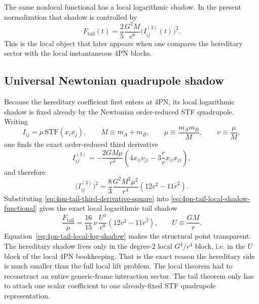 \documentclass[11pt]{article}
\begin{document}
The same nonlocal functional has a local logarithmic shadow.  In the present
normalization that shadow is controlled by
\begin{equation}
F_{\mathrm{tail}}(t)
=
\frac{2}{5}\frac{G^2 M}{c^8}
\bigl(I_{ij}^{(3)}(t)\bigr)^2.
\label{eq:4pn-tail-local-shadow-functional}
\end{equation}
This is the local object that later appears when one compares the hereditary
sector with the local instantaneous $4$PN blocks.

\subsection{Universal Newtonian quadrupole shadow}
\label{sec:tail-newtonian-shadow}

Because the hereditary coefficient first enters at $4$PN, its local logarithmic
shadow is fixed already by the Newtonian order-reduced STF quadrupole.  Writing
\begin{equation}
I_{ij}
=
\mu\,\mathrm{STF}(x_i x_j),
\qquad
M \equiv m_A+m_B,
\qquad
\mu \equiv \frac{m_A m_B}{M},
\qquad
\nu \equiv \frac{\mu}{M},
\label{eq:4pn-tail-newtonian-quadrupole}
\end{equation}
one finds the exact order-reduced third derivative
\begin{equation}
I_{ij}^{(3)}
=
-
\frac{2GM\mu}{r^3}
\left(
4x_{\langle i}v_{j\rangle}
-
3\frac{\dot r}{r}x_{\langle i}x_{j\rangle}
\right),
\label{eq:4pn-tail-third-derivative}
\end{equation}
and therefore
\begin{equation}
\bigl(I_{ij}^{(3)}\bigr)^2
=
\frac{8}{3}\frac{G^2 M^2 \mu^2}{r^4}
\left(12v^2-11\dot r^2\right).
\label{eq:4pn-tail-third-derivative-square}
\end{equation}
Substituting \eqref{eq:4pn-tail-third-derivative-square} into
\eqref{eq:4pn-tail-local-shadow-functional} gives the exact local logarithmic
tail shadow
\begin{equation}
\boxed{
\frac{F_{\mathrm{tail}}}{\mu}
=
\frac{16}{15}\,\nu\,\frac{U^4}{c^8}
\left(12v^2-11\dot r^2\right),
\qquad
U\equiv \frac{GM}{r}.
}
\label{eq:4pn-tail-local-log-shadow}
\end{equation}
Equation~\eqref{eq:4pn-tail-local-log-shadow} makes the structural point
transparent.  The hereditary shadow lives only in the degree-$2$ local
\(G^4/r^4\) block, i.e. in the $U$ block of the local $4$PN bookkeeping.  That
is the exact reason the hereditary side is much smaller than the full local lift
problem.  The local theorem had to reconstruct an entire generic-frame
interaction sector.  The tail theorem only has to attach one scalar coefficient
to one already-fixed STF quadrupole representation.
\end{document}
